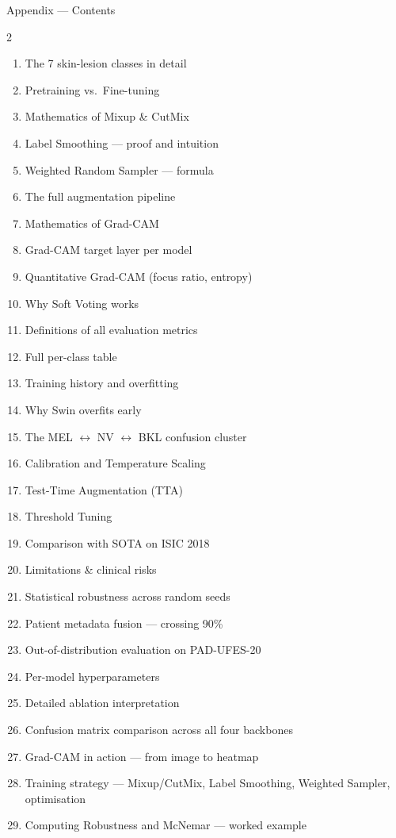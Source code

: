 \documentclass[10pt, aspectratio=169]{beamer}
\begin{document}
\begin{frame}{Appendix --- Contents}
    \footnotesize
    \begin{multicols}{2}
    \begin{enumerate}
        \item The 7 skin-lesion classes in detail
        \item Pretraining vs.\ Fine-tuning
        \item Mathematics of Mixup \& CutMix
        \item Label Smoothing --- proof and intuition
        \item Weighted Random Sampler --- formula
        \item The full augmentation pipeline
        \item Mathematics of Grad-CAM
        \item Grad-CAM target layer per model
        \item Quantitative Grad-CAM (focus ratio, entropy)
        \item Why Soft Voting works
        \item Definitions of all evaluation metrics
        \item Full per-class table
        \item Training history and overfitting
        \item Why Swin overfits early
        \item The MEL $\leftrightarrow$ NV $\leftrightarrow$ BKL confusion cluster
        \item Calibration and Temperature Scaling
        \item Test-Time Augmentation (TTA)
        \item Threshold Tuning
        \item Comparison with SOTA on ISIC 2018
        \item Limitations \& clinical risks
        \item Statistical robustness across random seeds
        \item Patient metadata fusion --- crossing 90\%
        \item Out-of-distribution evaluation on PAD-UFES-20
        \item Per-model hyperparameters
        \item Detailed ablation interpretation
        \item Confusion matrix comparison across all four backbones
        \item Grad-CAM in action --- from image to heatmap
        \item Training strategy --- Mixup/CutMix, Label Smoothing, Weighted Sampler, optimisation
        \item Computing Robustness and McNemar --- worked example
    \end{enumerate}
    \end{multicols}
\end{frame}
\end{document}
